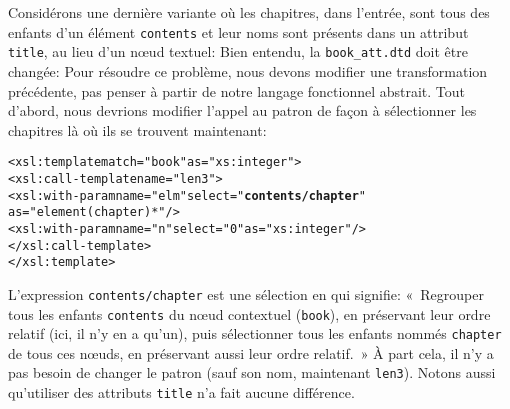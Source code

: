 Considérons une dernière variante où les chapitres, dans l'entrée,
sont tous des enfants d'un élément \texttt{contents} et leur noms sont
présents dans un attribut \texttt{title}, au lieu d'un n{\oe}ud textuel:
\noindent Bien entendu, la \DTD \texttt{book\_att.dtd} doit être
changée: 
\noindent Pour résoudre ce problème, nous devons modifier une
transformation \XSLT précédente, pas penser à partir de notre langage
fonctionnel abstrait. Tout d'abord, nous devrions modifier l'appel au
patron de façon à sélectionner les chapitres là où ils se trouvent maintenant:
\begin{alltt}
\small  <xsl:template match="book" as="xs:integer">
    <xsl:call-template name="len3">
      <xsl:with-param name="elm" select="\textbf{contents/chapter}"
                                 as="element(chapter)*"/>
      <xsl:with-param name="n" select="0" as="xs:integer"/>
    </xsl:call-template>
  </xsl:template>
\end{alltt}
L'expression \texttt{contents/chapter} est une sélection en \XPath qui
signifie: «~Regrouper tous les enfants \texttt{contents} du n{\oe}ud
contextuel (\texttt{book}), en préservant leur ordre relatif (ici, il
n'y en a qu'un), puis sélectionner tous les enfants nommés
\texttt{chapter} de tous ces n{\oe}uds, en préservant aussi leur ordre
relatif.~» À part cela, il n'y a pas besoin de changer le patron (sauf
son nom, maintenant \texttt{len3}). Notons aussi qu'utiliser des
attributs \texttt{title} n'a fait aucune différence.

